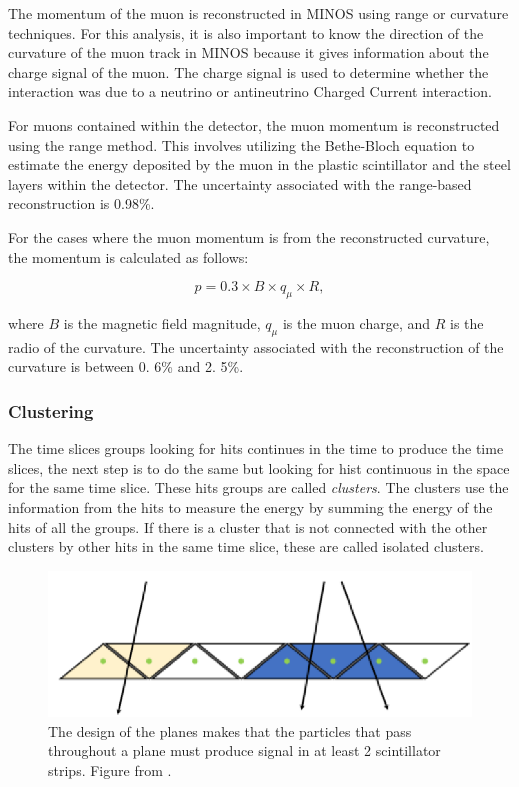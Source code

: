 The momentum of the muon is reconstructed in MINOS using range or curvature techniques. For this analysis, it is also important to know the direction of the curvature of the muon track in MINOS because it gives information about the charge signal of the muon. The charge signal is used to determine whether the interaction was due to a neutrino or antineutrino Charged Current interaction.

For muons contained within the detector, the muon momentum is reconstructed using the range method. This involves utilizing the Bethe-Bloch equation to estimate the energy deposited by the muon in the plastic scintillator and the steel layers within the detector. The uncertainty associated with the range-based reconstruction is 0.98\%. 

For the cases where the muon momentum is from the reconstructed curvature, the momentum is calculated as follows:

\begin{equation}
    p = 0.3\times B \times q_\mu \times R,
\end{equation}

where $B$ is the magnetic field magnitude, $q_\mu$ is the muon charge, and $R$ is the radio of the curvature. The uncertainty associated with the reconstruction of the curvature is between 0. 6\% and 2. 5\%. 



\subsubsection{Clustering}
\label{Cap:MnvExp:MnvDetector:DataReconstruction:Clustering}

The time slices groups looking for hits continues in the time to produce the time slices, the next step is to do the same but looking for hist continuous in the space for the same time slice. These hits groups are called \textit{ clusters}. The clusters use the information from the hits to measure the energy by summing the energy of the hits of all the groups. If there is a cluster that is not connected with the other clusters by other hits in the same time slice, these are called isolated clusters.

\begin{figure}[!htb]
    \centering
    \includegraphics[scale=0.5]{Figures/Chapter2/ClusterFormation.png}
    \caption{The design of the planes makes that the particles that pass throughout a plane must produce signal in at least 2 scintillator strips. Figure from \cite{AaronThesis}.}
    \label{fig:MnvExp:MnvDetector:DataReconstruction:Clustering:ClusterFormation}
\end{figure}

